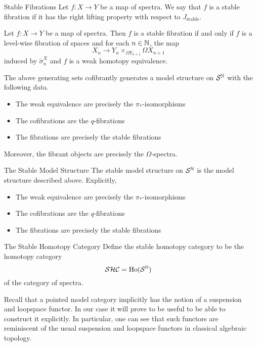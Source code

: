 \documentclass[a4paper]{article}
\begin{document}
\begin{defn}{Stable Fibrations}{} Let $f:X\to Y$ be a map of spectra. We say that $f$ is a stable fibration if it has the right lifting property with respect to $J_\text{stable}$. 
\end{defn}

\begin{prp}{}{} Let $f:X\to Y$ be a map of spectra. Then $f$ is a stable fibration if and only if $f$ is a level-wise fibration of spaces and for each $n\in\mathbb{N}$, the map $$X_n\to Y_n\times_{\Omega Y_{n+1}}\Omega X_{n+1}$$ induced by $\widetilde{\sigma}_n^X$ and $f$ is a weak homotopy equivalence. 
\end{prp}

\begin{thm}{}{} The above generating sets cofibrantly generates a model structure on $\mathcal{S}^{\mathbb{N}}$ with the following data. 
\begin{itemize}
\item The weak equivalence are precisely the $\pi_\ast$-isomorphisms
\item The cofibrations are the $q$-fibrations
\item The fibrations are precisely the stable fibrations
\end{itemize}
Moreover, the fibrant objects are precisely the $\Omega$-spectra. 
\end{thm}

\begin{defn}{The Stable Model Structure}{} The stable model structure on $\mathcal{S}^{\mathbb{N}}$ is the model structure described above. Explicitly, 
\begin{itemize}
\item The weak equivalence are precisely the $\pi_\ast$-isomorphisms
\item The cofibrations are the $q$-fibrations
\item The fibrations are precisely the stable fibrations
\end{itemize}
\end{defn}

\begin{defn}{The Stable Homotopy Category}{} Define the stable homotopy category to be the homotopy category $$\mathcal{S}\mathcal{H}\mathcal{C}=\text{Ho}(\mathcal{S}^{\mathbb{N}})$$ of the category of spectra. 
\end{defn}

Recall that a pointed model category implicitly has the notion of a suspension and loopspace functor. In our case it will prove to be useful to be able to construct it explicitly. In particular, one can see that such functors are reminiscent of the usual suspension and loopspace functors in classical algebraic topology. 
\end{document}
